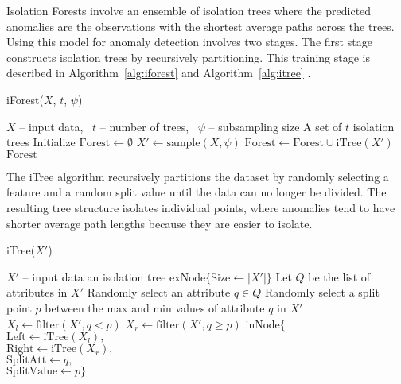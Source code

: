\documentclass[10pt, conference]{IEEEtran}
\begin{document}
Isolation Forests involve an ensemble of isolation trees where the predicted anomalies are the observations with the shortest average paths across the trees. Using this model for anomaly detection involves two stages. The first stage constructs isolation trees by recursively partitioning. This training stage is described in Algorithm~\ref{alg:iforest} and Algorithm~\ref{alg:itree} \cite{iforest2}.

\begin{algorithm}[H]
	\caption{iForest($X$, $t$, $\psi$)}
	\label{alg:iforest}
	\begin{algorithmic}[1]
		\Require $X$ -- input data, \ $t$ -- number of trees, \ $\psi$ -- subsampling size
		\Ensure A set of $t$ isolation trees
		\State Initialize $\text{Forest} \gets \emptyset$
		\State $X' \gets \text{sample}(X, \psi)$
		\State $\text{Forest} \gets \text{Forest} \cup \text{iTree}(X')$
		\EndFor \\
		\Return $\text{Forest}$
	\end{algorithmic}
\end{algorithm}

The iTree algorithm recursively partitions the dataset by randomly selecting a feature and a random split value until the data can no longer be divided. The resulting tree structure isolates individual points, where anomalies tend to have shorter average path lengths because they are easier to isolate.

\begin{algorithm}[H]
	\caption{iTree($X'$)}
	\label{alg:itree}
	\begin{algorithmic}[1]
		\Require $X'$ -- input data  
		\Ensure an isolation tree
		\Return $\text{exNode}\{\text{Size} \leftarrow |X'|\}$
		\Else
		\State Let $Q$ be the list of attributes in $X'$
		\State Randomly select an attribute $q \in Q$
		\State Randomly select a split point $p$ between the max and min values of attribute $q$ in $X'$
		\State $X_l \gets \text{filter}(X', q < p)$
		\State $X_r \gets \text{filter}(X', q \ge p)$
		\Return $\text{inNode}\{$ \\
		\hspace*{1.5em} $\text{Left} \leftarrow \text{iTree}(X_l),$ \\
		\hspace*{1.5em} $\text{Right} \leftarrow \text{iTree}(X_r),$ \\
		\hspace*{1.5em} $\text{SplitAtt} \leftarrow q,$ \\
		\hspace*{1.5em} $\text{SplitValue} \leftarrow p\}$ 
		\EndIf
	\end{algorithmic}
\end{algorithm}
\end{document}
